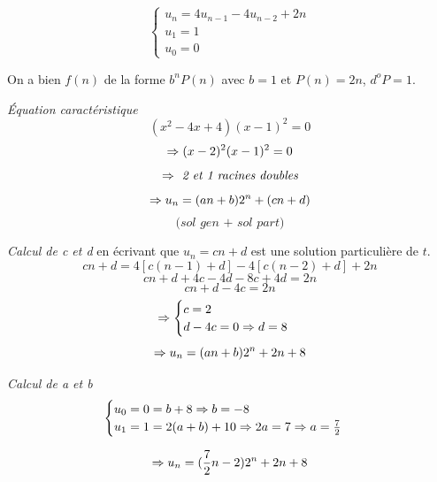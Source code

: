 \begin{exercice}
\[ \begin{cases} u_n = 4 u_{n-1} - 4 u_{n-2} + 2 n \\ u_1 = 1 \\ u_0 = 0 \end{cases} \]

On a bien $f(n)$ de la forme $b^n P(n)$ avec $b = 1$ et $P(n) = 2n$, $d^o P = 1$.

\textit{Équation caractéristique} 
\[ (x^2-4x+4)(x-1)^2 = 0 \]
\[ \Rightarrow (x-2)^2(x-1)^2 = 0 \]
\[ \Rightarrow \textit{ 2 et 1 racines doubles} \]
\[ \Rightarrow u_n=(an+b)2^n+(cn+d) \]
\[ \textit{(sol gen + sol part)} \]

\textit{Calcul de c et d} en écrivant que $u_n=cn+d$ est une solution particulière de $t$.
\[ cn+d=4[c(n-1)+d]-4[c(n-2)+d]+2n \] 
\[ cn+d+4c-4d-8c+4d=2n \]
\[ cn+d-4c=2n \]
\[ \Rightarrow \begin{cases} c=2 \\ d-4c=0 \Rightarrow d=8 \end{cases} \]
\[ \Rightarrow u_n=(an+b)2^n+2n+8 \]

\textit{Calcul de a et b}
\[ \begin{cases} u_0=0=b+8 \Rightarrow b=-8 \\u_1=1=2(a+b)+10 \Rightarrow 2a=7 \Rightarrow a=\frac{7}{2} \end{cases} \]

\[ \Rightarrow u_n=(\frac{7}{2}n-2)2^n+2n+8 \]

\end{exercice}

